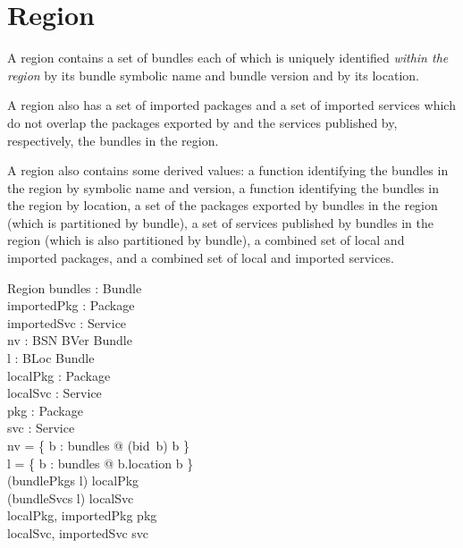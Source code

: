 \documentclass[a4paper,9pt]{article}
\begin{document}
\clearpage
\section{Region}
\label{cha:region}

A region contains a set of bundles each of which is uniquely identified \textit{within the region}
by its bundle symbolic name and bundle version and by its location.

A region also has a set of imported packages and a set of imported services which do not overlap
the packages exported by and the services published by, respectively, the bundles in the region.

A region also contains some derived values: a function identifying the bundles in the region by
symbolic name and version, a function identifying the bundles in the region by location,
a set of the packages exported by bundles in the region
(which is partitioned by bundle), a set of services published by bundles in the region (which is also
partitioned by bundle), a combined set of local and imported packages, and a combined set
of local and imported services.
\begin{schema}{Region}
  bundles : \power Bundle \\
  importedPkg : \power Package \\
  importedSvc : \power Service \\
\also
  nv : BSN \cross BVer \pinj Bundle \\
  l : BLoc \pinj Bundle \\
  localPkg : \power Package \\
  localSvc : \power Service \\
  pkg : \power Package \\
  svc : \power Service \\
\where
  nv = \{ b : bundles @ (bid~b) \mapsto b \} \\
  l = \{ b : bundles @ b.location \mapsto b \} \\
 (bundlePkgs \circ l) \partition localPkg \land \\
 (bundleSvcs \circ l) \partition localSvc \\
 \langle localPkg, importedPkg \rangle \partition pkg \\
 \langle localSvc, importedSvc \rangle \partition svc \\
\end{schema}
\end{document}
